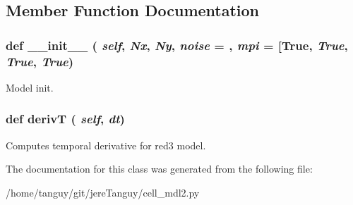 \subsection{Member Function Documentation}
\hypertarget{classcell__mdl2_1_1_red6_ac775ee34451fdfa742b318538164070e}{
\subsubsection[{\_\-\_\-init\_\-\_\-}]{\setlength{\rightskip}{0pt plus 5cm}def \_\-\_\-init\_\-\_\- ( {\em self}, \/   {\em Nx}, \/   {\em Ny}, \/   {\em noise} = {}, \/   {\em mpi} = {\ttfamily \mbox{[}True}, \/   {\em True}, \/   {\em True}, \/   {\em True})}}
\label{classcell__mdl2_1_1_red6_ac775ee34451fdfa742b318538164070e}
\begin{DoxyVerb}Model init.\end{DoxyVerb}
 \hypertarget{classcell__mdl2_1_1_red6_ad67701a6bb599a16a9eb386aa1cd4328}{
\subsubsection[{derivT}]{\setlength{\rightskip}{0pt plus 5cm}def derivT ( {\em self}, \/   {\em dt})}}
\label{classcell__mdl2_1_1_red6_ad67701a6bb599a16a9eb386aa1cd4328}
\begin{DoxyVerb}Computes temporal derivative for red3 model.\end{DoxyVerb}
 

The documentation for this class was generated from the following file:\begin{DoxyCompactItemize}
\item 
/home/tanguy/git/jereTanguy/cell\_\-mdl2.py\end{DoxyCompactItemize}
